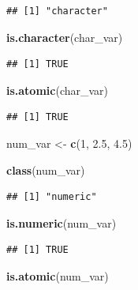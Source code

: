 \documentclass[
]{book}
\newenvironment{Shaded}{\begin{snugshade}}{\end{snugshade}}
\newcommand{\DecValTok}[1]{\textcolor[rgb]{0.00,0.00,0.81}{#1}}
\newcommand{\FloatTok}[1]{\textcolor[rgb]{0.00,0.00,0.81}{#1}}
\newcommand{\FunctionTok}[1]{\textcolor[rgb]{0.13,0.29,0.53}{\textbf{#1}}}
\newcommand{\NormalTok}[1]{#1}
\newcommand{\OtherTok}[1]{\textcolor[rgb]{0.56,0.35,0.01}{#1}}
\begin{document}
\begin{verbatim}
## [1] "character"
\end{verbatim}

\begin{Shaded}
\begin{Highlighting}[]
\FunctionTok{is.character}\NormalTok{(char\_var)}
\end{Highlighting}
\end{Shaded}

\begin{verbatim}
## [1] TRUE
\end{verbatim}

\begin{Shaded}
\begin{Highlighting}[]
\FunctionTok{is.atomic}\NormalTok{(char\_var)}
\end{Highlighting}
\end{Shaded}

\begin{verbatim}
## [1] TRUE
\end{verbatim}

\begin{Shaded}
\begin{Highlighting}[]
\NormalTok{num\_var }\OtherTok{\textless{}{-}} \FunctionTok{c}\NormalTok{(}\DecValTok{1}\NormalTok{, }\FloatTok{2.5}\NormalTok{, }\FloatTok{4.5}\NormalTok{)}

\FunctionTok{class}\NormalTok{(num\_var)}
\end{Highlighting}
\end{Shaded}

\begin{verbatim}
## [1] "numeric"
\end{verbatim}

\begin{Shaded}
\begin{Highlighting}[]
\FunctionTok{is.numeric}\NormalTok{(num\_var)}
\end{Highlighting}
\end{Shaded}

\begin{verbatim}
## [1] TRUE
\end{verbatim}

\begin{Shaded}
\begin{Highlighting}[]
\FunctionTok{is.atomic}\NormalTok{(num\_var)}
\end{Highlighting}
\end{Shaded}
\end{document}
